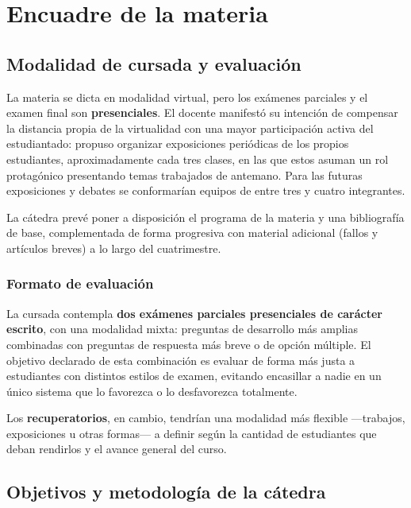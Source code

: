 \documentclass[12pt,oneside]{book}
\begin{document}
\chapter[Encuadre de la materia]{Encuadre de la materia}

\section{Modalidad de cursada y evaluación}

La materia se dicta en modalidad virtual, pero los exámenes parciales y el examen final son \textbf{presenciales}. El docente manifestó su intención de compensar la distancia propia de la virtualidad con una mayor participación activa del estudiantado: propuso organizar exposiciones periódicas de los propios estudiantes, aproximadamente cada tres clases, en las que estos asuman un rol protagónico presentando temas trabajados de antemano. Para las futuras exposiciones y debates se conformarían equipos de entre tres y cuatro integrantes.

La cátedra prevé poner a disposición el programa de la materia y una bibliografía de base, complementada de forma progresiva con material adicional (fallos y artículos breves) a lo largo del cuatrimestre.

\subsection{Formato de evaluación}

La cursada contempla \textbf{dos exámenes parciales presenciales de carácter escrito}, con una modalidad mixta: preguntas de desarrollo más amplias combinadas con preguntas de respuesta más breve o de opción múltiple. El objetivo declarado de esta combinación es evaluar de forma más justa a estudiantes con distintos estilos de examen, evitando encasillar a nadie en un único sistema que lo favorezca o lo desfavorezca totalmente.

Los \textbf{recuperatorios}, en cambio, tendrían una modalidad más flexible ---trabajos, exposiciones u otras formas--- a definir según la cantidad de estudiantes que deban rendirlos y el avance general del curso.

\section{Objetivos y metodología de la cátedra}
\end{document}
